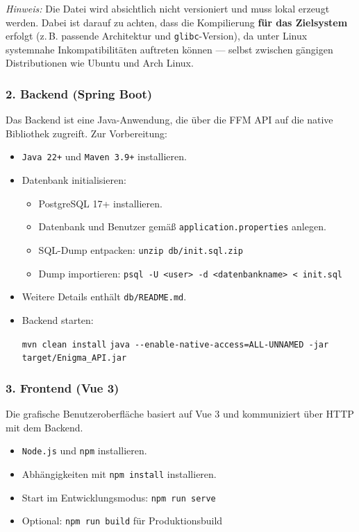 \documentclass[12pt, ngerman, a4paper, numbers=noenddot]{article}
\begin{document}
\textit{Hinweis:} Die Datei wird absichtlich nicht versioniert und muss lokal erzeugt werden.  
Dabei ist darauf zu achten, dass die Kompilierung \textbf{für das Zielsystem} erfolgt (z.\,B. passende Architektur und \lstinline|glibc|-Version), da unter Linux systemnahe Inkompatibilitäten auftreten können — selbst zwischen gängigen Distributionen wie Ubuntu und Arch Linux.

\subsubsection*{2. Backend (Spring Boot)}

Das Backend ist eine Java-Anwendung, die über die FFM API auf die native Bibliothek zugreift. Zur Vorbereitung:

\begin{itemize}
	\item \lstinline|Java 22+| und \lstinline|Maven 3.9+| installieren.
	\item Datenbank initialisieren:
	\begin{itemize}
		\item PostgreSQL 17+ installieren.
		\item Datenbank und Benutzer gemäß \lstinline|application.properties| anlegen.
		\item SQL-Dump entpacken: \lstinline|unzip db/init.sql.zip|
		\item Dump importieren:  
		\lstinline|psql -U <user> -d <datenbankname> < init.sql|
	\end{itemize}
	\item Weitere Details enthält \lstinline|db/README.md|.
	\item Backend starten:
	
	\lstinline|mvn clean install|  
	\lstinline|java --enable-native-access=ALL-UNNAMED -jar target/Enigma_API.jar|
\end{itemize}

\subsubsection*{3. Frontend (Vue 3)}

Die grafische Benutzeroberfläche basiert auf Vue 3 und kommuniziert über HTTP mit dem Backend.

\begin{itemize}
	\item \lstinline|Node.js| und \lstinline|npm| installieren.
	\item Abhängigkeiten mit \lstinline|npm install| installieren.
	\item Start im Entwicklungsmodus: \lstinline|npm run serve|
	\item Optional: \lstinline|npm run build| für Produktionsbuild
\end{itemize}
\end{document}

